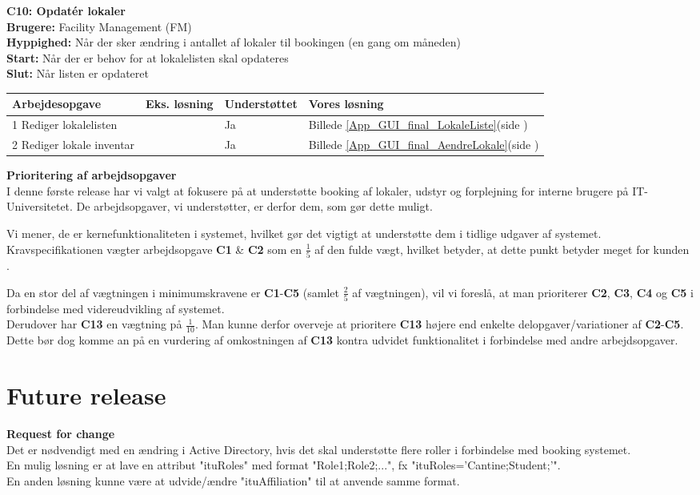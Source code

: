 \textbf{C10: Opdatér lokaler}
\\\textbf{Brugere:} Facility Management (FM)\\
\textbf{Hyppighed:} Når der sker ændring i antallet af lokaler til bookingen (en gang om måneden)\\
\textbf{Start:} Når der er behov for at lokalelisten skal opdateres\\
\textbf{Slut:} Når listen er opdateret

\begin{tabular}{ | p{7.5cm} | p{2.5cm} | p{2.2cm} | p{3.3cm} |}
\hline
\textbf{Arbejdesopgave} & \textbf{Eks. løsning} & \textbf{Understøttet}  & \textbf{Vores løsning}\\ 
\hline
1 Rediger lokalelisten & & Ja & Billede \ref{App_GUI_final_LokaleListe}(side \pageref{App_GUI_final_LokaleListe}) \\ 
\hline
2 Rediger lokale inventar & & Ja & Billede \ref{App_GUI_final_AendreLokale}(side \pageref{App_GUI_final_AendreLokale}) \\ 
\hline
\end{tabular}

\textbf{Prioritering af arbejdsopgaver}
\\I denne første release har vi valgt at fokusere på at understøtte booking af lokaler, udstyr og forplejning for interne brugere på IT-Universitetet. De arbejdsopgaver, vi understøtter, er derfor dem, som gør dette muligt.

Vi mener, de er kernefunktionaliteten i systemet, hvilket gør det vigtigt at understøtte dem i tidlige udgaver af systemet. \\Kravspecifikationen vægter arbejdsopgave \textbf{C1} \& \textbf{C2} som en $\frac{1}{5}$ af den fulde vægt, hvilket betyder, at dette punkt betyder meget for kunden \cite[s. 8]{kravspec}.

Da en stor del af vægtningen i minimumskravene er \textbf{C1}-\textbf{C5} (samlet $\frac{2}{5}$ af vægtningen), vil vi foreslå, at man prioriterer \textbf{C2}, \textbf{C3}, \textbf{C4} og \textbf{C5} i forbindelse med videreudvikling af systemet.
\\Derudover har \textbf{C13} en vægtning på $\frac{1}{10}$.  Man kunne derfor overveje at prioritere \textbf{C13} højere end enkelte delopgaver/variationer af \textbf{C2}-\textbf{C5}. Dette bør dog komme an på en vurdering af omkostningen af \textbf{C13} kontra udvidet funktionalitet i forbindelse med andre arbejdsopgaver.

\section{Future release}
\label{Evaluation_Future}
\textbf{Request for change}
\\Det er nødvendigt med en ændring i Active Directory, hvis det skal understøtte flere roller i forbindelse med booking systemet. 
\\En mulig løsning er at lave en attribut "ituRoles" med format "Role1;Role2;...", fx "ituRoles='Cantine;Student;'". 
\\En anden løsning kunne være at udvide/ændre "ituAffiliation" til at anvende samme format.

